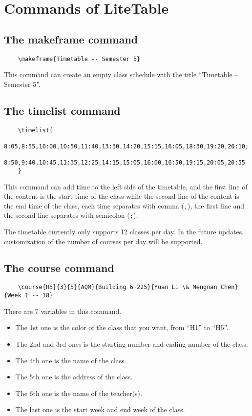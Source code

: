 \documentclass[11pt]{article}
\def\pkg#1{\texorpdfstring{\textcolor{pkgcolor}{\textsf{#1}}}{“#1”}}
\def\cmd#1{\texorpdfstring{\textcolor{cmdcolor}{\textsf{#1}}}{“#1”}}
\begin{document}
\section{Commands of \pkg{LiteTable}}

\subsection{The \cmd{makeframe} command}
\begin{verbatim}
    \makeframe{Timetable -- Semester 5}
\end{verbatim}

This command can create an empty class schedule with the title ``Timetable -- Semester 5''.

\subsection{The \cmd{timelist} command}
\begin{verbatim}
    \timelist{
      8:05,8:55,10:00,10:50,11:40,13:30,14:20,15:15,16:05,18:30,19:20,20:10;
      8:50,9:40,10:45,11:35,12:25,14:15,15:05,16:00,16:50,19:15,20:05,20:55
    }
\end{verbatim}

This command can add time to the left side of the timetable, and the first line of the content is the start time of the class while the second line of the content is the end time of the class, each time separates with comma (\verb|,|), the first line and the second line separates with semicolon (\verb|;|).

The timetable currently only supports 12 classes per day. In the future updates, customization of the number of courses per day will be supported.

\subsection{The \cmd{course} command}
\begin{verbatim}
    \course{H5}{3}{5}{AQM}{Building 6·225}{Yuan Li \& Mengnan Chen}{Week 1 -- 18}
\end{verbatim}

There are 7 variables in this command.
\begin{itemize}
  \item The 1st one is the color of the class that you want, from ``H1'' to ``H5''.
  \item The 2nd and 3rd ones is the starting number and ending number of the class.
  \item The 4th one is the name of the class.
  \item The 5th one is the address of the class.
  \item The 6th one is the name of the teacher(s).
  \item The last one is the start week and end week of the class.
\end{itemize}
\end{document}

